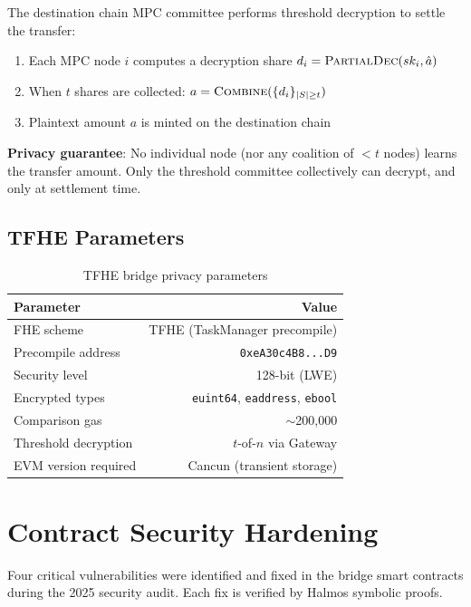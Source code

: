 \documentclass[11pt]{article}
\begin{document}
The destination chain MPC committee performs threshold decryption to settle the transfer:

\begin{enumerate}
  \item Each MPC node $i$ computes a decryption share $d_i = \textsc{PartialDec}(sk_i, \hat{a})$
  \item When $t$ shares are collected: $a = \textsc{Combine}(\{d_i\}_{|S| \geq t})$
  \item Plaintext amount $a$ is minted on the destination chain
\end{enumerate}

\textbf{Privacy guarantee}: No individual node (nor any coalition of $< t$ nodes) learns the transfer amount. Only the threshold committee collectively can decrypt, and only at settlement time.

\subsection{TFHE Parameters}

\begin{table}[h]
\centering
\begin{tabular}{lr}
\toprule
\textbf{Parameter} & \textbf{Value} \\
\midrule
FHE scheme & TFHE (TaskManager precompile) \\
Precompile address & \texttt{0xeA30c4B8...D9} \\
Security level & 128-bit (LWE) \\
Encrypted types & \texttt{euint64}, \texttt{eaddress}, \texttt{ebool} \\
Comparison gas & $\sim$200,000 \\
Threshold decryption & $t$-of-$n$ via Gateway \\
EVM version required & Cancun (transient storage) \\
\bottomrule
\end{tabular}
\caption{TFHE bridge privacy parameters}
\end{table}

\section{Contract Security Hardening}\label{sec:contract-security}

Four critical vulnerabilities were identified and fixed in the bridge smart contracts during the 2025 security audit. Each fix is verified by Halmos symbolic proofs.
\end{document}
